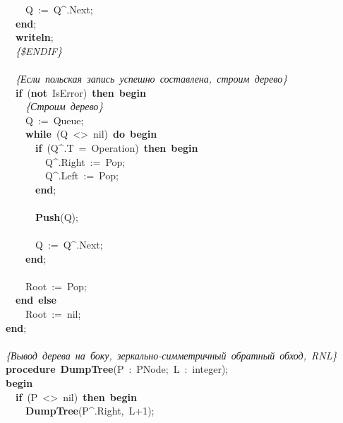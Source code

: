 \mbox{}\ \ \ \ Q\ :=\ Q\textasciicircum{}.Next; \\
\mbox{}\ \ \textbf{end}; \\
\mbox{}\ \ \textbf{writeln}; \\
\mbox{}\ \ \textit{\{\$ENDIF\}} \\
\mbox{}\ \  \\
\mbox{}\ \ \textit{\{Если\ польская\ запись\ успешно\ составлена,\ строим\ дерево\}} \\
\mbox{}\ \ \textbf{if}\ (\textbf{not}\ IsError)\ \textbf{then}\ \textbf{begin} \\
\mbox{}\ \ \ \ \textit{\{Строим\ дерево\}} \\
\mbox{}\ \ \ \ Q\ :=\ Queue; \\
\mbox{}\ \ \ \ \textbf{while}\ (Q\ \textless{}\textgreater{}\ nil)\ \textbf{do}\ \textbf{begin} \\
\mbox{}\ \ \ \ \ \ \textbf{if}\ (Q\textasciicircum{}.T\ =\ Operation)\ \textbf{then}\ \textbf{begin} \\
\mbox{}\ \ \ \ \ \ \ \ Q\textasciicircum{}.Right\ :=\ Pop; \\
\mbox{}\ \ \ \ \ \ \ \ Q\textasciicircum{}.Left\ :=\ Pop; \\
\mbox{}\ \ \ \ \ \ \textbf{end}; \\
\mbox{} \\
\mbox{}\ \ \ \ \ \ \textbf{Push}(Q); \\
\mbox{}\ \ \ \  \\
\mbox{}\ \ \ \ \ \ Q\ :=\ Q\textasciicircum{}.Next; \\
\mbox{}\ \ \ \ \textbf{end}; \\
\mbox{} \\
\mbox{}\ \ \ \ Root\ :=\ Pop; \\
\mbox{}\ \ \textbf{end}\ \textbf{else} \\
\mbox{}\ \ \ \ Root\ :=\ nil; \\
\mbox{}\textbf{end}; \\
\mbox{} \\
\mbox{}\textit{\{Вывод\ дерева\ на\ боку,\ зеркально-симметричный\ обратный\ обход,\ RNL\}} \\
\mbox{}\textbf{procedure}\ \textbf{DumpTree}(P\ :\ PNode;\ L\ :\ integer); \\
\mbox{}\textbf{begin} \\
\mbox{}\ \ \textbf{if}\ (P\ \textless{}\textgreater{}\ nil)\ \textbf{then}\ \textbf{begin} \\
\mbox{}\ \ \ \ \textbf{DumpTree}(P\textasciicircum{}.Right,\ L+1); \\
